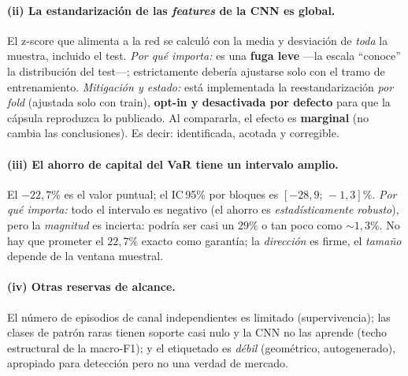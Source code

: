 \documentclass[11pt,a4paper]{article}
\begin{document}
\paragraph{(ii) La estandarización de las \emph{features} de la CNN es global.}
El z-score que alimenta a la red se calculó con la media y desviación de
\emph{toda} la muestra, incluido el test.
\textit{Por qué importa:} es una \textbf{fuga leve} ---la escala ``conoce'' la
distribución del test---; estrictamente debería ajustarse solo con el tramo de
entrenamiento.
\textit{Mitigación y estado:} está implementada la reestandarización \emph{por
fold} (ajustada solo con train), \textbf{opt-in y desactivada por defecto} para
que la cápsula reproduzca lo publicado. Al compararla, el efecto es
\textbf{marginal} (no cambia las conclusiones). Es decir: identificada, acotada y
corregible.

\paragraph{(iii) El ahorro de capital del VaR tiene un intervalo amplio.} El
$-22{,}7\%$ es el valor puntual; el IC\,95\% por bloques es
$[-28{,}9;\,-1{,}3]\%$.
\textit{Por qué importa:} todo el intervalo es negativo (el ahorro es
\emph{estadísticamente robusto}), pero la \emph{magnitud} es incierta: podría ser
casi un $29\%$ o tan poco como $\sim 1{,}3\%$. No hay que prometer el $22{,}7\%$
exacto como garantía; la \emph{dirección} es firme, el \emph{tamaño} depende de la
ventana muestral.

\paragraph{(iv) Otras reservas de alcance.} El número de episodios de canal
independientes es limitado (supervivencia); las clases de patrón raras tienen
soporte casi nulo y la CNN no las aprende (techo estructural de la macro-F1); y el
etiquetado es \emph{débil} (geométrico, autogenerado), apropiado para detección
pero no una verdad de mercado.

\end{document}
